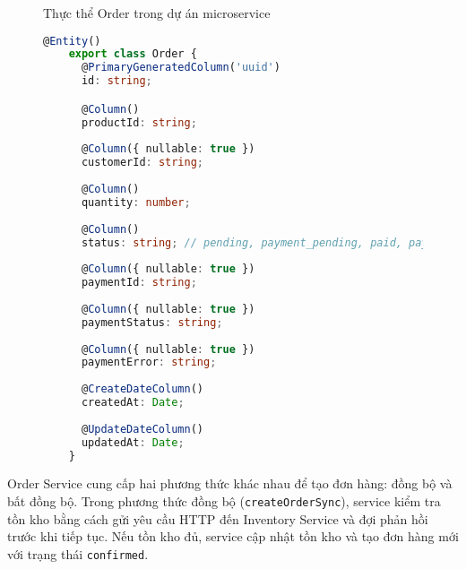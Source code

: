 \begin{figure}[H]{Thực thể Order trong dự án microservice}
  \centering
  \begin{minipage}{\textwidth}
    \begin{lstlisting}[language=Typescript, basicstyle=\scriptsize\ttfamily]
    @Entity()
    export class Order {
      @PrimaryGeneratedColumn('uuid')
      id: string;

      @Column()
      productId: string;
    
      @Column({ nullable: true })
      customerId: string;
    
      @Column()
      quantity: number;
    
      @Column()
      status: string; // pending, payment_pending, paid, payment_failed, completed
    
      @Column({ nullable: true })
      paymentId: string;
    
      @Column({ nullable: true })
      paymentStatus: string;
    
      @Column({ nullable: true })
      paymentError: string;
    
      @CreateDateColumn()
      createdAt: Date;
    
      @UpdateDateColumn()
      updatedAt: Date;
    }
  \end{lstlisting}
  \end{minipage}
\end{figure}

Order Service cung cấp hai phương thức khác nhau để tạo đơn hàng: đồng bộ và bất đồng bộ. Trong phương thức đồng bộ (\texttt{createOrderSync}), service kiểm tra tồn kho bằng cách gửi yêu cầu HTTP đến Inventory Service và đợi phản hồi trước khi tiếp tục. Nếu tồn kho đủ, service cập nhật tồn kho và tạo đơn hàng mới với trạng thái \texttt{confirmed}.

